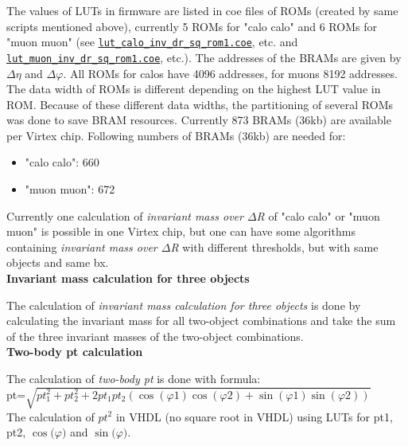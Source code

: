 The values of LUTs in firmware are listed in coe files of ROMs (created by same scripts mentioned above), currently 5 ROMs for "calo calo" and 6 ROMs for "muon muon" (see \href{\gitbranch/firmware/ngc/lut_calo_inv_dr_sq_rom1.coe}{\texttt{\textquotesingle lut\_calo\_inv\_dr\_sq\_rom1.coe\textquotesingle }}, etc. and \href{\gitbranch/firmware/ngc/lut_muon_inv_dr_sq_rom1.coe}{\texttt{\textquotesingle lut\_muon\_inv\_dr\_sq\_rom1.coe\textquotesingle }}, etc.). The addresses of the BRAMs are given by $\Delta\eta$ and $\Delta\varphi$. All ROMs for calos have 4096 addresses, for muons 8192 addresses. The data width of ROMs is different depending on the highest LUT value in ROM. Because of these different data widths, the partitioning of several ROMs was done to save BRAM resources. Currently 873 BRAMs (36kb) are available per Virtex chip.
Following numbers of BRAMs (36kb) are needed for:
\begin{itemize}
\item "calo calo": 660
\item "muon muon": 672
\end{itemize}
Currently one calculation of \textit{invariant mass over $\Delta$R} of "calo calo" or "muon muon" is possible in one Virtex chip, but one can have some algorithms containing \textit{invariant mass over $\Delta$R} with different thresholds, but with same objects and same bx.\\

\textbf{Invariant mass calculation for three objects}
\label{sec:gtl:inv_mass_3_obj_calculation}

The calculation of \textit{invariant mass calculation for three objects} is done by calculating the invariant mass for all two-object combinations and take the sum of the three invariant masses of the two-object combinations.\\

\textbf{Two-body pt calculation}
\label{sec:gtl:twobody_pt_calculation}

The calculation of \textit{two-body pt} is done with formula:\\

pt=$\sqrt{pt^2_1 + pt^2_2 + 2  pt_1 pt_2 (\cos(\varphi1) \cos(\varphi2) + \sin(\varphi1) \sin(\varphi2))}$\\

The calculation of ${pt^2}$ in VHDL (no square root in VHDL) using LUTs for pt1, pt2, $\cos($$\varphi$$)$ and $\sin($$\varphi$$)$.

